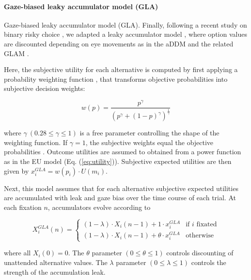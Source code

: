 \documentclass[11pt, a4paper]{article}
\begin{document}
\paragraph{Gaze-biased leaky accumulator model (GLA)}

Gaze-biased leaky accumulator model (GLA). Finally, following a recent study on binary risky choice \parencite{glickman2019FormationPreferenceRisky}, we adapted a leaky accumulator model \parencite{usher2001TimeCoursePerceptual}, where option values are discounted depending on eye movements as in the aDDM \parencite{krajbich2010VisualFixationsComputation,krajbich2011MultialternativeDriftdiffusionModel} and the related GLAM \parencite{molter2019GLAMboxPythonToolbox,thomas2019GazeBiasDifferences}.

Here, the subjective utility for each alternative is computed by first applying a probability weighting function \parencite{tversky1992AdvancesProspectTheory}, that transforms objective probabilities into subjective decision weights:

\begin{equation}
    \label{eq:pweighting}
    w(p) = \frac{p^\gamma}{(p^\gamma + (1 - p)^\gamma)^{\frac{1}{\gamma}}}
\end{equation}

where $\gamma~(0.28 \le \gamma \le 1)$ is a free parameter controlling the shape of the weighting function. If $\gamma = 1$, the subjective weights equal the objective probabilities \parencite{cavagnaro2013DiscriminatingProbabilityWeighting}. Outcome utilities are assumed to obtained from a power function as in the EU model (Eq. (\ref{eq:utility})). Subjective expected utilities are then given by $x_i^{GLA} = w(p_i) \cdot U(m_i)$.

Next, this model assumes that for each alternative subjective expected utilities are accumulated with leak and gaze bias over the time course of each trial. At each fixation $n$, accumulators evolve according to

\begin{equation}
    X_i^{GLA}(n) = \begin{cases}
             (1 - \lambda) \cdot X_i(n - 1) + 1 \cdot x_i^{GLA} &\text{if $i$ fixated}\\
             (1 - \lambda) \cdot X_i(n - 1) + \theta \cdot x_i^{GLA} &\text{otherwise}
             \end{cases}
\end{equation}

where all $X_i(0) = 0$. The $\theta$ parameter $(0 \le \theta \le 1)$ controls discounting of unattended alternative values. The $\lambda$ parameter $(0 \le \lambda \le 1)$ controls the strength of the accumulation leak.
\end{document}
